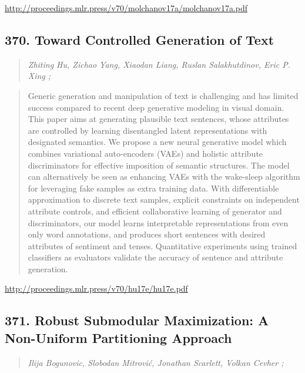 \documentclass{article}
\begin{document}
\href{http://proceedings.mlr.press/v70/molchanov17a/molchanov17a.pdf}{http://proceedings.mlr.press/v70/molchanov17a/molchanov17a.pdf}

\subsection{370. Toward Controlled Generation of Text}

\begin{quote}
\footnotesize{\textit{Zhiting Hu, Zichao Yang, Xiaodan Liang, Ruslan Salakhutdinov, Eric P. Xing ;}}

\end{quote}

\begin{quote}
    Generic generation and manipulation of text is challenging and has limited success compared to recent deep generative modeling in visual domain. This paper aims at generating plausible text sentences, whose attributes are controlled by learning disentangled latent representations with designated semantics. We propose a new neural generative model which combines variational auto-encoders (VAEs) and holistic attribute discriminators for effective imposition of semantic structures. The model can alternatively be seen as enhancing VAEs with the wake-sleep algorithm for leveraging fake samples as extra training data. With differentiable approximation to discrete text samples, explicit constraints on independent attribute controls, and efficient collaborative learning of generator and discriminators, our model learns interpretable representations from even only word annotations, and produces short sentences with desired attributes of sentiment and tenses. Quantitative experiments using trained classifiers as evaluators validate the accuracy of sentence and attribute generation.  
\end{quote}

\href{http://proceedings.mlr.press/v70/hu17e/hu17e.pdf}{http://proceedings.mlr.press/v70/hu17e/hu17e.pdf}

\subsection{371. Robust Submodular Maximization: A Non-Uniform Partitioning Approach}

\begin{quote}
\footnotesize{\textit{Ilija Bogunovic, Slobodan Mitrović, Jonathan Scarlett, Volkan Cevher ;}}

\end{quote}
\end{document}
